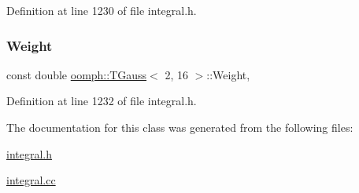 Definition at line 1230 of file integral.\+h.

\mbox{\label{classoomph_1_1TGauss_3_012_00_0116_01_4_ab89539b4866863f4d58b2a88cc262ac4}} 
\subsubsection{\texorpdfstring{Weight}{Weight}}
{\footnotesize\ttfamily const double \hyperlink{classoomph_1_1TGauss}{oomph\+::\+T\+Gauss}$<$ 2, 16 $>$\+::Weight\hspace{0.3cm}{\ttfamily [static]}, {\ttfamily [private]}}



Definition at line 1232 of file integral.\+h.



The documentation for this class was generated from the following files\+:\begin{DoxyCompactItemize}
\item 
\hyperlink{integral_8h}{integral.\+h}\item 
\hyperlink{integral_8cc}{integral.\+cc}\end{DoxyCompactItemize}
